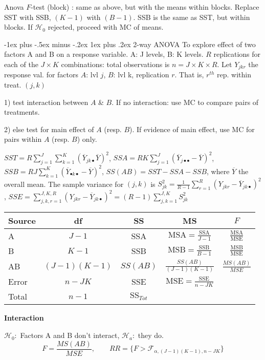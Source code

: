 \documentclass[8pt,landscape]{extarticle}
\makeatletter
\renewcommand{\subsubsection}{\@startsection{subsubsection}{3}{0mm}%
                                {-1ex plus -.5ex minus -.2ex}%
                                {1ex plus .2ex}%
                                {\normalfont\small\bfseries}}
\makeatother
\begin{document}
\begin{multicols}{3}
Anova $F$-test (block) : same as above, but with the means within blocks. Replace SST with SSB, $(K-1)$ with $(B-1)$. SSB is the same as SST, but within blocks. If $\mathcal{H}_0$ rejected, proceed with MC of means. 

\subsubsection{2-way ANOVA}
To explore effect of two factors A and B on a response variable. A: J levels, B: K levels. $R$ replications for each of the $J \times K$ combinations: total observations is $n = J \times K \times R$. Let $Y_{jkr}$ the response val. for factors $A$: lvl $j$, $B$: lvl k, replication $r$. That is, $r^{th}$ rep. within treat. $(j,k)$

1) test interaction between $A$ \& $B$. If no interaction: use MC to compare pairs of treatments.

2) else test for main effect of $A$ (resp. $B$). If evidence of main effect, use MC for pairs within $A$ (resp. $B$) only.

$SST = R \sum_{j=1}^J \sum_{k=1}^K (\overline{Y}_{jk \bullet} \overline{Y})^2$,
$SSA = RK \sum_{j=1}^J (\overline{Y}_{j\bullet \bullet} -\overline{Y})^2$,
$SSB = RJ \sum_{k=1}^K (\overline{Y}_{\bullet k \bullet} -\overline{Y})^2$, $SS(AB) = SST-SSA-SSB$, where $\overline{Y}$ the overall mean. The sample variance for $(j,k)$ is $S_{jk}^2 = \frac{1}{ R-1} \sum_{r=1}^R (Y_{jkr} -\overline{Y}_{jk\bullet} )^2$, $SSE = \sum_{j,k,r =1}^{J,K,R} (Y_{jkr} - \overline{Y}_{jk \bullet} )^2 =(R-1) \sum^{J,K}_{j,k=1} S_{jk}^2$

\begin{tabular}{lcccc}
Source & df & SS & MS & $F$ \\
\hline
A & $J-1$ & SSA & $\mathrm{MSA}=\frac{\mathrm{SSA}}{J-1}$ & $\frac{\mathrm{MSA}}{\mathrm{MSE}}$ \\
B & $K-1$ & SSB & $\mathrm{MSB}=\frac{\mathrm{SSB}}{B-1}$ & $\frac{\mathrm{MSB}}{\mathrm{MSE}}$ \\
AB & $(J-1)(K-1)$ & $SS(AB)$ & $\frac{SS(AB)}{(J-1)(K-1)}$ & $\frac{MS(AB)}{MSE}$ \\
Error & $n-JK$ & SSE & $\mathrm{MSE}=\frac{\mathrm{SSE}}{n-JK}$& \\
\hline
Total& $n-1$ & $\mathrm{SS}_{Tot}$

\end{tabular}

\textbf{Interaction}

$\mathcal{H}_0 :$ Factors A and B don't interact, $\mathcal{H}_a :$ they do.
$$F = \frac{MS(AB)}{ MSE}, \quad \quad RR = \{ F > \mathcal{F}_{\alpha, (J-1)(K-1), n-JK} \} $$


\end{multicols}
\end{document}
